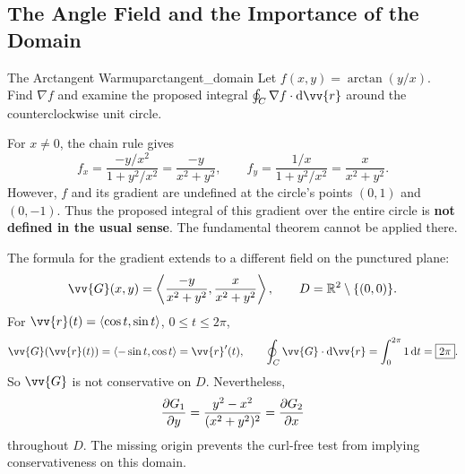 \newpage
\subsection{The Angle Field and the Importance of the Domain}
\begin{problem}{The Arctangent Warmup}{arctangent_domain}
Let $f(x,y) = \arctan(y/x)$. Find $\nabla f$ and examine the proposed integral $\oint_C\nabla f\cdot\dd{\vv{r}}$ around the counterclockwise unit circle.
\end{problem}
\begin{sol}
For $x \ne 0$, the chain rule gives
\[
    f_x = \frac{-y/x^2}{1 + y^2/x^2} = \frac{-y}{x^2 + y^2},\qquad
    f_y = \frac{1/x}{1 + y^2/x^2} = \frac{x}{x^2 + y^2}.
\]
However, $f$ and its gradient are undefined at the circle's points $(0,1)$ and $(0,-1)$. Thus the proposed integral of this gradient over the entire circle is \textbf{not defined in the usual sense}. The fundamental theorem cannot be applied there.

The formula for the gradient extends to a different field on the punctured plane:
\[
    \vv{G}(x,y) = \ang{\frac{-y}{x^2 + y^2},\frac{x}{x^2 + y^2}},\qquad
    D = \mathbb{R}^2\setminus\{(0,0)\}.
\]
For $\vv{r}(t) = \ang{\cos t,\sin t}$, $0 \le t \le 2\pi$,
\[
    \vv{G}(\vv{r}(t)) = \ang{-\sin t,\cos t} = \vv{r}'(t),\qquad
    \oint_C\vv{G}\cdot\dd{\vv{r}} = \int_0^{2\pi}1\,\dd{t} = \boxed{2\pi}.
\]
So $\vv{G}$ is not conservative on $D$. Nevertheless,
\[
    \pdv{G_1}{y} = \frac{y^2 - x^2}{(x^2 + y^2)^2}
    = \pdv{G_2}{x}
\]
throughout $D$. The missing origin prevents the curl-free test from implying conservativeness on this domain.
\end{sol}

\newpage
